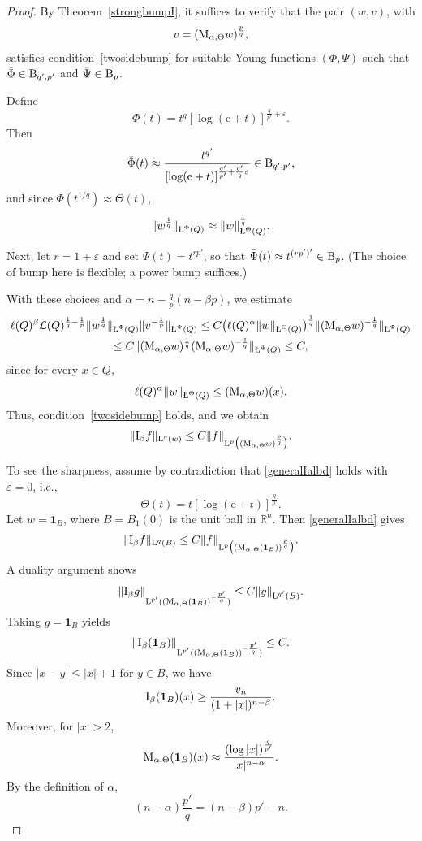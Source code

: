\documentclass[11pt, a4paper, reqno]{amsart}
\newcommand{\Lup}{\textup{L}}
\newcommand{\Ldash}{\textup{\L}}
\theoremstyle{definition}
\theoremstyle{remark}
\begin{document}
\begin{proof} 
By Theorem~\ref{strongbumpI}, it suffices to verify that the pair $(w,v)$, with 
\[
v = (\textup{M}_{\alpha,\Theta} w)^{\frac{p}{q}},
\] 
satisfies condition~\eqref{twosidebump} for suitable Young functions $(\Phi,\Psi)$ such that $\bar\Phi \in \textup B_{q',p'}$ and $\bar\Psi \in \textup B_p$.

Define
\[
\Phi(t) = t^q[\log(\mathrm e + t)]^{\frac{q}{p'} + \varepsilon}.
\]
Then
\[
\bar\Phi(t) \approx \frac{t^{q'}}{[\log(\mathrm e + t)]^{\frac{q'}{p'} + \frac{q'}{q}\varepsilon}} \in \textup B_{q',p'},
\]
and since $\Phi(t^{1/q}) \approx \Theta(t)$,
\[
\|w^{\frac{1}{q}}\|_{\Ldash^\Phi(Q)} \approx \|w\|_{\Ldash^\Theta(Q)}^{\frac{1}{q}}.
\]

Next, let $r = 1 + \varepsilon$ and set $\Psi(t) = t^{r p'}$, so that $\bar\Psi(t) \approx t^{(r p')'} \in \textup B_p$. (The choice of bump here is flexible; a power bump suffices.)

With these choices and $\alpha = n - \frac{q}{p}(n-\beta p)$, we estimate
\begin{multline*} 
\ell(Q)^\beta \mathcal{L}(Q)^{\frac{1}{q}-\frac{1}{p}} 
\|w^{\frac{1}{q}}\|_{\Ldash^\Phi(Q)} \|v^{-\frac{1}{p}}\|_{\Ldash^\Psi(Q)} 
\leq C \big(\ell(Q)^{\alpha} \|w\|_{\Ldash^\Theta(Q)}\big)^{\frac{1}{q}} \|(\textup{M}_{\alpha,\Theta} w)^{-\frac{1}{q}}\|_{\Ldash^\Psi(Q)} \\
\leq C \|(\textup{M}_{\alpha,\Theta} w)^{\frac{1}{q}} (\textup{M}_{\alpha,\Theta} w)^{-\frac{1}{q}}\|_{\Ldash^\Psi(Q)} \leq C,
\end{multline*}
since for every $x \in Q$,
\[
\ell(Q)^{\alpha} \|w\|_{\Ldash^\Theta(Q)} \le (\textup{M}_{\alpha,\Theta} w)(x).
\]
Thus, condition~\eqref{twosidebump} holds, and we obtain
\[
\|\textup{I}_\beta f\|_{\Lup^q(w)} \leq C \|f\|_{\Lup^p\big((\textup{M}_{\alpha,\Theta} w)^{\frac{p}{q}}\big)}.
\]

To see the sharpness, assume by contradiction that \eqref{generalIalbd} holds with $\varepsilon = 0$, i.e.,
\[
\Theta(t) = t[\log(\mathrm e + t)]^{\frac{q}{p'}}.
\]
Let $w = \mathbf{1}_B$, where $B = B_1(0)$ is the unit ball in $\mathbb{R}^n$. Then \eqref{generalIalbd} gives
\[
\|\textup{I}_\beta f\|_{\Lup^q(B)} \leq C \|f\|_{\Lup^p\big((\textup{M}_{\alpha,\Theta}(\mathbf{1}_B))^{\frac{p}{q}}\big)}.
\]
A duality argument shows
\[
\|\textup{I}_\beta g\|_{\Lup^{p'}((\textup{M}_{\alpha,\Theta}(\mathbf{1}_B))^{-\frac{p'}{q}})} \leq C \|g\|_{\Lup^{q'}(B)}.
\]
Taking $g = \mathbf{1}_B$ yields
\[
\|\textup{I}_\beta (\mathbf{1}_B)\|_{\Lup^{p'}((\textup{M}_{\alpha,\Theta}(\mathbf{1}_B))^{-\frac{p'}{q}})} \leq C.
\]
Since $|x-y| \leq |x| + 1$ for $y \in B$, we have
\[
\textup{I}_\beta(\mathbf{1}_B)(x) \ge \frac{v_n}{(1+|x|)^{n-\beta}}.
\]
Moreover, for $|x|>2$,
\[
\textup{M}_{\alpha,\Theta}(\mathbf{1}_B)(x) \approx \frac{(\log|x|)^{\frac{q}{p'}}}{|x|^{n-\alpha}}.
\]
By the definition of $\alpha$,
\[
(n-\alpha)\frac{p'}{q} = (n-\beta)p' - n.
\]


\end{proof}
\end{document}
